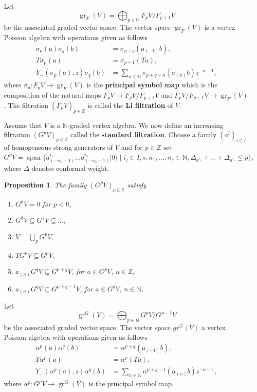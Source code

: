 \documentclass[12pt,a4paper]{article}
\newtheorem{proposition}{Proposition}
\DeclareMathOperator{\gr}{gr}
\DeclareMathOperator{\vspan}{span}
\newcommand{\vac}{|0\rangle}
\begin{document}
Let
\begin{equation*}
  \gr_F(V)=\bigoplus_{p\in \mathbb{N}}F_pV/F_{p+1}V
\end{equation*}
be the associated graded vector space.
The vector space $\gr_F(V)$ is a vertex Poisson algebra with operations given as follows
\begin{align*}
  \sigma_p(a)\sigma_q(b)&=\sigma_{p+q}(a_{(-1)}b), \\
  T\sigma_p(a)&=\sigma_{p+1}(Ta), \\
  Y_-(\sigma_p(a),z)\sigma_q(b)&=\sum_{n\in \mathbb{N}}\sigma_{p+q-n}(a_{(n)}b)z^{-n-1},
\end{align*}
where $\sigma_p:F_pV\to \gr_F(V)$ is the \textbf{principal symbol map} which is the composition of the natural maps $F_pV\to F_pV/F_{p+1}V$ and $F_pV/F_{p+1}V\to \gr_F(V)$.
The filtration $(F_pV)_{p\in \mathbb{Z}}$ is called the \textbf{Li filtration} of $V$.

Assume that $V$ is a $\mathbb{N}$-graded vertex algebra.
We now define an increasing filtration $(G^pV)_{p\in \mathbb{Z}}$ called the \textbf{standard filtration}.
Choose a family $(a^i)_{i\in I}$ of homogeneous strong generators of $V$ and for $p\in \mathbb{Z}$ set
\begin{equation*}
  G^pV = \vspan\{a^{i_1}_{(-n_1-1)}\dots a^{i_s}_{(-n_s-1)}\vac\mid i_j\in I, s,n_1,\dots,n_s\in \mathbb{N}, \Delta_{a^{i_1}}+\dots+\Delta_{a^{i_s}}\le p\},
\end{equation*}
where $\Delta$ denotes conformal weight.

\begin{proposition}
  \label{prp:2}
  The family $(G^pV)_{p\in \mathbb{Z}}$ satisfy
  \begin{enumerate}[label={(\alph*)}]
  \item $G^pV=0$ for $p<0$,
  \item $G^0V\subseteq G^1V\subseteq\dots$,
  \item $V=\bigcup_pG^pV$,
  \item $TG^pV\subseteq G^pV$,
  \item $a_{(n)}G^qV\subseteq G^{p+q}V$, for $a\in G^pV$, $n\in \mathbb{Z}$,
  \item $a_{(n)}G^qV\subseteq G^{p+q-1}V$, for $a\in G^pV$, $n\in \mathbb{N}$.
  \end{enumerate}
\end{proposition}
Let
\begin{equation*}
  \gr^G(V)=\bigoplus_{p\in\mathbb{N}}G^pV/G^{p-1}V
\end{equation*}
be the associated graded vector space.
The vector space $gr^G(V)$ a vertex Poisson algebra with operations given as follows
\begin{align*}
  \alpha^p(a)\alpha^q(b)&=\alpha^{p+q}(a_{(-1)}b), \\
  T\alpha^p(a)&=\alpha^{p}(Ta), \\
  Y_-(\alpha^p(a),z)\alpha^q(b)&=\sum_{n\in \mathbb{N}}\alpha^{p+q-1}(a_{(n)}b)z^{-n-1},
\end{align*}
where $\alpha^p:G^pV\to \gr^G(V)$ is the principal symbol map.
\end{document}
